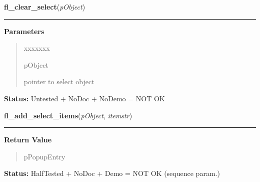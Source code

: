     \label{xformslib:library:fl_clear_select}

    \vspace{0.5ex}

\hspace{.8\funcindent}\begin{boxedminipage}{\funcwidth}

    \raggedright \textbf{fl\_clear\_select}(\textit{pObject})

    \vspace{-1.5ex}

    \rule{\textwidth}{0.5\fboxrule}
\setlength{\parskip}{2ex}
\setlength{\parskip}{1ex}
      \textbf{Parameters}
      \vspace{-1ex}

      \begin{quote}
        \begin{Ventry}{xxxxxxx}

          \item[pObject]

          pointer to select object

        \end{Ventry}

      \end{quote}

\textbf{Status:} Untested + NoDoc + NoDemo = NOT OK



    \end{boxedminipage}

    \label{xformslib:library:fl_add_select_items}

    \vspace{0.5ex}

\hspace{.8\funcindent}\begin{boxedminipage}{\funcwidth}

    \raggedright \textbf{fl\_add\_select\_items}(\textit{pObject}, \textit{itemstr})

    \vspace{-1.5ex}

    \rule{\textwidth}{0.5\fboxrule}
\setlength{\parskip}{2ex}
\setlength{\parskip}{1ex}
      \textbf{Return Value}
    \vspace{-1ex}

      \begin{quote}
      pPopupEntry

      \end{quote}

\textbf{Status:} HalfTested + NoDoc + Demo = NOT OK (sequence param.)



    \end{boxedminipage}

